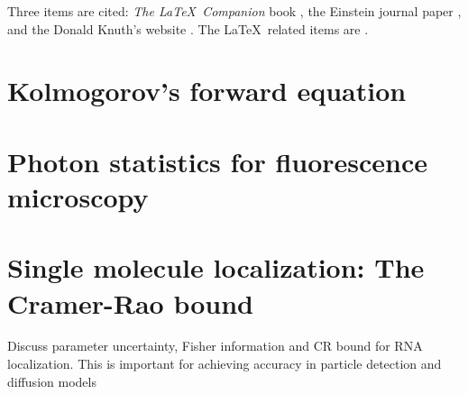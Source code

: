 \documentclass{article}
\begin{document}
Three items are cited: \textit{The \LaTeX\ Companion} book \cite{latexcompanion}, the Einstein journal paper \citet{einstein}, and the 
Donald Knuth's website \cite{knuthwebsite}. The \LaTeX\ related items are
\cite{latexcompanion,knuthwebsite}.  



\appendix

\section{Kolmogorov's forward equation}

\section{Photon statistics for fluorescence microscopy}


\section{Single molecule localization: The Cramer-Rao bound}

Discuss parameter uncertainty, Fisher information and CR bound for RNA localization. This is important for achieving accuracy in particle detection and diffusion models
\end{document}
